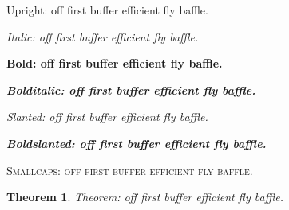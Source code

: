 \documentclass{article}
\newtheorem{theorem}{Theorem}
\begin{document}
Upright: off first buffer efficient fly baffle.

\textit{Italic: off first buffer efficient fly baffle.}

\textbf{Bold: off first buffer efficient fly baffle.}

\textbf{\textit{Bolditalic: off first buffer efficient fly baffle.}}

\textsl{Slanted: off first buffer efficient fly baffle.}

\textbf{\textsl{Boldslanted: off first buffer efficient fly baffle.}}

\textsc{Smallcaps: off first buffer efficient fly baffle.}

\begin{theorem}
Theorem: off first buffer efficient fly baffle.
\end{theorem}
\end{document}
